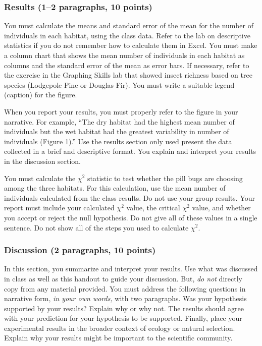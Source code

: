 \documentclass[12pt, hidelinks]{exam}
\newcommand\chisq{$\chi^2$}
\begin{document}
\subsubsection*{Results (1–2 paragraphs, 10 points)}

You must calculate the means and standard error of the mean for the number of individuals in each habitat, using the class data. Refer to the lab on descriptive statistics if you do not remember how to calculate them in Excel. You must make a column chart that shows the mean number of individuals in each habitat as columns and the standard error of the mean as error bars. If necessary, refer to the exercise in the Graphing Skills lab that showed insect richness based on tree species (Lodgepole Pine or Douglas Fir). You must write a suitable legend (caption) for the figure. 

When you report your results, you must properly refer to the figure in your narrative. For example, ``The dry habitat had the highest mean number of individuals but the wet habitat had the greatest variability in number of individuals (Figure 1).'' Use the results section only used  present the data collected in a brief and
descriptive format. You explain and interpret your results in the discussion section.   

You must calculate the \chisq{} statistic to test whether the pill bugs are choosing among the three habitats. For this calculation, use the mean number of individuals calculated from the class results. Do not use your group results. Your report must include your calculated \chisq{} value, the critical \chisq{} value, and whether you accept or reject the null hypothesis. Do not give all of these values in a single sentence. Do not show all of the steps you used to calculate \chisq{}. 


\subsubsection*{Discussion (2 paragraphs, 10 points)} 

In this section, you summarize and interpret your results. Use what
was discussed in class as well as this handout to guide
your discussion. But, \emph{do not} directly copy from any material provided.
You must address the following questions in narrative form, \emph{in your own words,} with two
paragraphs. Was your hypothesis supported by your results? Explain why or why not. 
The results should agree with your prediction for your hypothesis to be supported. 
Finally, place your experimental results in the broader context of ecology or natural
selection. Explain why your results might be important to the
scientific community.
\end{document}
